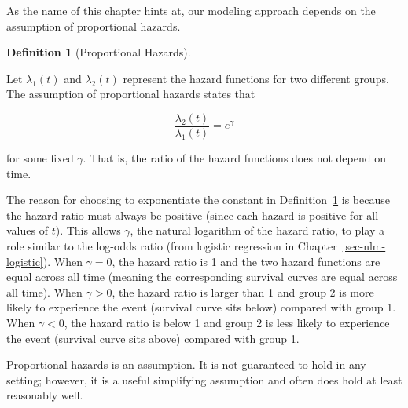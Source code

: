 \documentclass[
  letterpaper,
  DIV=11,
  numbers=noendperiod]{scrreprt}
\theoremstyle{definition}
\newtheorem{definition}{Definition}[chapter]
\theoremstyle{definition}
\theoremstyle{remark}
\begin{document}
As the name of this chapter hints at, our modeling approach depends on
the assumption of proportional hazards.

\begin{definition}[Proportional
Hazards]\protect\hypertarget{def-proportional-hazards}{}\label{def-proportional-hazards}

Let \(\lambda_1(t)\) and \(\lambda_2(t)\) represent the hazard functions
for two different groups. The assumption of proportional hazards states
that

\[\frac{\lambda_2(t)}{\lambda_1(t)} = e^{\gamma}\]

for some fixed \(\gamma\). That is, the ratio of the hazard functions
does not depend on time.

\end{definition}

The reason for choosing to exponentiate the constant in
Definition~\ref{def-proportional-hazards} is because the hazard ratio
must always be positive (since each hazard is positive for all values of
\(t\)). This allows \(\gamma\), the natural logarithm of the hazard
ratio, to play a role similar to the log-odds ratio (from logistic
regression in Chapter~\ref{sec-nlm-logistic}). When \(\gamma = 0\), the
hazard ratio is 1 and the two hazard functions are equal across all time
(meaning the corresponding survival curves are equal across all time).
When \(\gamma > 0\), the hazard ratio is larger than 1 and group 2 is
more likely to experience the event (survival curve sits below) compared
with group 1. When \(\gamma < 0\), the hazard ratio is below 1 and group
2 is less likely to experience the event (survival curve sits above)
compared with group 1.

\begin{tcolorbox}[enhanced jigsaw, left=2mm, toprule=.15mm, arc=.35mm, breakable, opacitybacktitle=0.6, opacityback=0, rightrule=.15mm, colbacktitle=quarto-callout-warning-color!10!white, coltitle=black, leftrule=.75mm, toptitle=1mm, colframe=quarto-callout-warning-color-frame, titlerule=0mm, title=\textcolor{quarto-callout-warning-color}{\faExclamationTriangle}\hspace{0.5em}{Warning}, bottomrule=.15mm, colback=white, bottomtitle=1mm]

Proportional hazards is an assumption. It is not guaranteed to hold in
any setting; however, it is a useful simplifying assumption and often
does hold at least reasonably well.

\end{tcolorbox}
\end{document}
